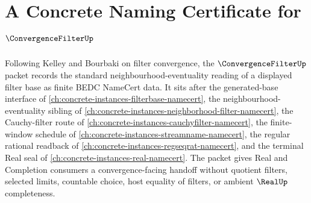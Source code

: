 \chapter{A Concrete Naming Certificate for $\ConvergenceFilterUp$}
\label{ch:concrete-instances-convergence-filter-namecert}

Following Kelley and Bourbaki on filter convergence, the $\ConvergenceFilterUp$ packet records the standard neighbourhood-eventuality reading of a displayed filter base as finite BEDC NameCert data. It sits after the generated-base interface of \autoref{ch:concrete-instances-filterbase-namecert}, the neighbourhood-eventuality sibling of \autoref{ch:concrete-instances-neighborhood-filter-namecert}, the Cauchy-filter route of \autoref{ch:concrete-instances-cauchyfilter-namecert}, the finite-window schedule of \autoref{ch:concrete-instances-streamname-namecert}, the regular rational readback of \autoref{ch:concrete-instances-regseqrat-namecert}, and the terminal Real seal of \autoref{ch:concrete-instances-real-namecert}. The packet gives Real and Completion consumers a convergence-facing handoff without quotient filters, selected limits, countable choice, host equality of filters, or ambient $\RealUp$ completeness.

